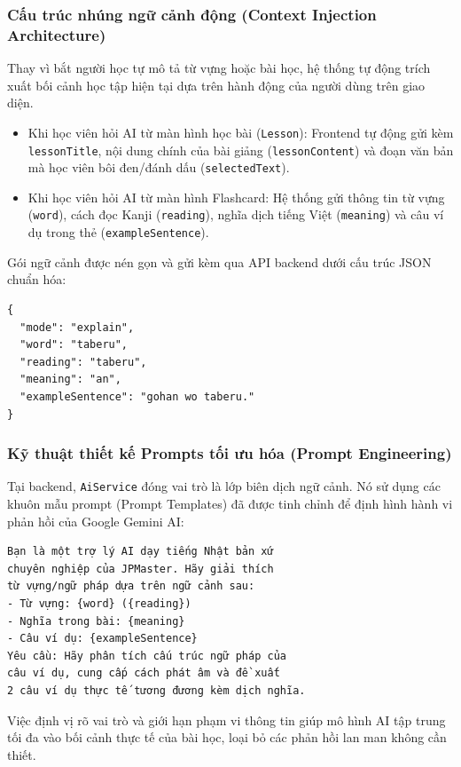 \documentclass[../DoAn.tex]{subfiles}
\begin{document}
\subsubsection{Cấu trúc nhúng ngữ cảnh động (Context Injection Architecture)}
Thay vì bắt người học tự mô tả từ vựng hoặc bài học, hệ thống tự động trích xuất bối cảnh học tập hiện tại dựa trên hành động của người dùng trên giao diện.
\begin{itemize}
    \item Khi học viên hỏi AI từ màn hình học bài (\texttt{Lesson}): Frontend tự động gửi kèm \texttt{lessonTitle}, nội dung chính của bài giảng (\texttt{lessonContent}) và đoạn văn bản mà học viên bôi đen/đánh dấu (\texttt{selectedText}).
    \item Khi học viên hỏi AI từ màn hình Flashcard: Hệ thống gửi thông tin từ vựng (\texttt{word}), cách đọc Kanji (\texttt{reading}), nghĩa dịch tiếng Việt (\texttt{meaning}) và câu ví dụ trong thẻ (\texttt{exampleSentence}).
\end{itemize}
Gói ngữ cảnh được nén gọn và gửi kèm qua API backend dưới cấu trúc JSON chuẩn hóa:
\begin{verbatim}
{
  "mode": "explain",
  "word": "taberu",
  "reading": "taberu",
  "meaning": "an",
  "exampleSentence": "gohan wo taberu."
}
\end{verbatim}

\subsubsection{Kỹ thuật thiết kế Prompts tối ưu hóa (Prompt Engineering)}
Tại backend, \texttt{AiService} đóng vai trò là lớp biên dịch ngữ cảnh. Nó sử dụng các khuôn mẫu prompt (Prompt Templates) đã được tinh chỉnh để định hình hành vi phản hồi của Google Gemini AI:
\begin{verbatim}
Bạn là một trợ lý AI dạy tiếng Nhật bản xứ
chuyên nghiệp của JPMaster. Hãy giải thích
từ vựng/ngữ pháp dựa trên ngữ cảnh sau:
- Từ vựng: {word} ({reading})
- Nghĩa trong bài: {meaning}
- Câu ví dụ: {exampleSentence}
Yêu cầu: Hãy phân tích cấu trúc ngữ pháp của
câu ví dụ, cung cấp cách phát âm và đề xuất 
2 câu ví dụ thực tế tương đương kèm dịch nghĩa.
\end{verbatim}
Việc định vị rõ vai trò và giới hạn phạm vi thông tin giúp mô hình AI tập trung tối đa vào bối cảnh thực tế của bài học, loại bỏ các phản hồi lan man không cần thiết.
\end{document}
